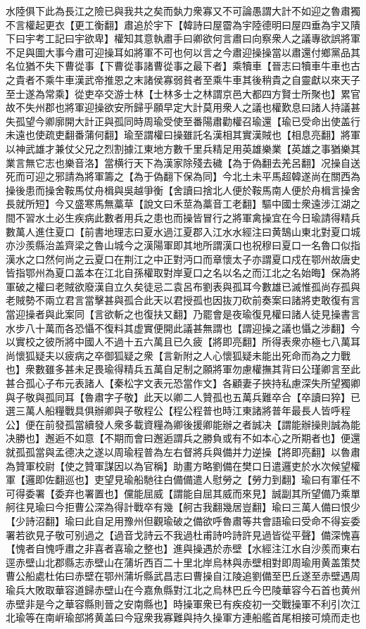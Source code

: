 水陸俱下此為長江之險已與我共之矣而埶力衆寡又不可論愚謂大計不如迎之魯肅獨不言權起更衣【更工衡翻】肅追於宇下【韓詩曰屋霤為宇陸德明曰屋四垂為宇又隤下曰宇考工記曰宇欲卑】權知其意執肅手曰卿欲何言肅曰向察衆人之議專欲誤將軍不足與圖大事今肅可迎操耳如將軍不可也何以言之今肅迎操操當以肅還付鄉黨品其名位猶不失下曹從事【下曹從事諸曹從事之最下者】乘犢車【晉志曰犢車牛車也古之貴者不乘牛車漢武帝推恩之末諸侯寡弱貧者至乘牛車其後稍貴之自靈獻以來天子至士遂為常乘】從吏卒交游士林【士林多士之林謂京邑大都四方賢士所聚也】累官故不失州郡也將軍迎操欲安所歸乎願早定大計莫用衆人之議也權歎息曰諸人持議甚失孤望今卿廓開大計正與孤同時周瑜受使至番陽肅勸權召瑜還【瑜已受命出使盖行未遠也使疏吏翻番蒲何翻】瑜至謂權曰操雖託名漢相其實漢賊也【相息亮翻】將軍以神武雄才兼仗父兄之烈割據江東地方數千里兵精足用英雄樂業【英雄之事猶樂其業言無它志也樂音洛】當横行天下為漢家除殘去穢【為于偽翻去羌呂翻】况操自送死而可迎之邪請為將軍籌之【為于偽翻下保為同】今北土未平馬超韓遂尚在關西為操後患而操舍鞍馬仗舟楫與吳越爭衡【舍讀曰捨北人便於鞍馬南人便於舟楫言操舍長就所短】今又盛寒馬無藁草【說文曰禾莖為藁音工老翻】驅中國士衆遠涉江湖之間不習水土必生疾病此數者用兵之患也而操皆冒行之將軍禽操宜在今日瑜請得精兵數萬人進住夏口【前書地理志曰夏水過江夏郡入江水水經注曰黄鵠山東北對夏口城亦沙羨縣治盖齊梁之魯山城今之漢陽軍即其地所謂漢口也祝穆曰夏口一名魯口似指漢水之口然何尚之云夏口在荆江之中正對沔口而章懷太子亦謂夏口戍在鄂州故唐史皆指鄂州為夏口盖本在江北自孫權取對岸夏口之名以名之而江北之名始晦】保為將軍破之權曰老賊欲廢漢自立久矣徒忌二袁呂布劉表與孤耳今數雄已滅惟孤尚存孤與老賊勢不兩立君言當擊甚與孤合此天以君授孤也因抜刀砍前奏案曰諸將吏敢復有言當迎操者與此案同【言欲斬之也復扶又翻】乃罷會是夜瑜復見權曰諸人徒見操書言水步八十萬而各恐懾不復料其虚實便開此議甚無謂也【謂迎操之議也懾之涉翻】今以實校之彼所將中國人不過十五六萬且已久疲【將即亮翻】所得表衆亦極七八萬耳尚懷狐疑夫以疲病之卒御狐疑之衆【言新附之人心懷狐疑未能出死命而為之力戰也】衆數雖多甚未足畏瑜得精兵五萬自足制之願將軍勿慮權撫其背曰公瑾卿言至此甚合孤心子布元表諸人【秦松字文表元恐當作文】各顧妻子挾持私慮深失所望獨卿與子敬與孤同耳【魯肅字子敬】此天以卿二人贊孤也五萬兵難卒合【卒讀曰猝】已選三萬人船糧戰具俱辦卿與子敬程公【程公程普也時江東諸將普年最長人皆呼程公】便在前發孤當續發人衆多載資糧為卿後援卿能辦之者誠决【謂能辦操則誠為能决勝也】邂逅不如意【不期而會曰邂逅謂兵之勝負或有不如本心之所期者也】便還就孤孤當與孟德决之遂以周瑜程普為左右督將兵與備并力逆操【將即亮翻】以魯肅為贊軍校尉【使之贊軍謀因以為官稱】助畫方略劉備在樊口日遣邏吏於水次候望權軍【邏即佐翻巡也】吏望見瑜船馳往白備備遣人慰勞之【勞力到翻】瑜曰有軍任不可得委署【委弃也署置也】儻能屈威【謂能自屈其威而來見】誠副其所望備乃乘單舸往見瑜曰今拒曹公深為得計戰卒有幾【舸古我翻幾居豈翻】瑜曰三萬人備曰恨少【少詩沼翻】瑜曰此自足用豫州但觀瑜破之備欲呼魯肅等共會語瑜曰受命不得妄委署若欲見子敬可别過之【過音戈詩云不我過杜甫詩吟詩許見過皆從平聲】備深愧喜【愧者自愧呼肅之非喜者喜瑜之整也】進與操遇於赤壁【水經注江水自沙羨而東右逕赤壁山北郡縣志赤壁山在蒲圻西百二十里北岸烏林與赤壁相對即周瑜用黄盖策焚曹公船處杜佑曰赤壁在鄂州蒲圻縣武昌志曰曹操自江陵追劉備至巴丘遂至赤壁遇周瑜兵大敗取華容道歸赤壁山在今嘉魚縣對江北之烏林巴丘今巴陵華容今石首也黄州赤壁非是今之華容縣則晉之安南縣也】時操軍衆已有疾疫初一交戰操軍不利引次江北瑜等在南㟁瑜部將黄盖曰今寇衆我寡難與持久操軍方連船艦首尾相接可燒而走也